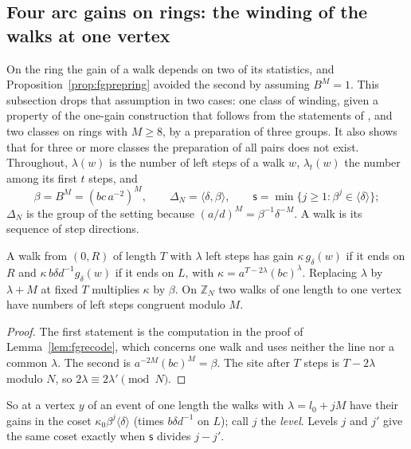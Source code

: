 \subsection{Four arc gains on rings: the winding of the walks at one vertex}

On the ring the gain of a walk depends on two of its statistics, and Proposition~\ref{prop:fgprepring} avoided the second by assuming $B^{M}=1$. This subsection drops that assumption in two cases: one class of winding, given a property of the one-gain construction that follows from the statements of \cite{dgone}, and two classes on rings with $M\ge8$, by a preparation of three groups. It also shows that for three or more classes the preparation of all pairs does not exist. Throughout, $\lambda(w)$ is the number of left steps of a walk $w$, $\lambda_t(w)$ the number among its first $t$ steps, and
\[
\beta=B^{M}=(bc\,a^{-2})^{M},\qquad \Delta_N=\langle\delta,\beta\rangle,\qquad \mathsf{s}=\min\{j\ge1:\beta^{j}\in\langle\delta\rangle\};
\]
$\Delta_N$ is the group of the setting because $(a/d)^{M}=\beta^{-1}\delta^{-M}$. A walk is its sequence of step directions.

\begin{lemma}\label{lem:fgkappa}
A walk from $(0,R)$ of length $T$ with $\lambda$ left steps has gain $\kappa\,g_\delta(w)$ if it ends on $R$ and $\kappa\,b\delta d^{-1}g_\delta(w)$ if it ends on $L$, with $\kappa=a^{T-2\lambda}(bc)^{\lambda}$. Replacing $\lambda$ by $\lambda+M$ at fixed $T$ multiplies $\kappa$ by $\beta$. On $\mathbb{Z}_N$ two walks of one length to one vertex have numbers of left steps congruent modulo $M$.
\end{lemma}
\begin{proof}
The first statement is the computation in the proof of Lemma~\ref{lem:fgrecode}, which concerns one walk and uses neither the line nor a common $\lambda$. The second is $a^{-2M}(bc)^{M}=\beta$. The site after $T$ steps is $T-2\lambda$ modulo $N$, so $2\lambda\equiv2\lambda'\pmod N$.
\end{proof}

So at a vertex $y$ of an event of one length the walks with $\lambda=l_0+jM$ have their gains in the coset $\kappa_0\beta^{j}\langle\delta\rangle$ (times $b\delta d^{-1}$ on $L$); call $j$ the \emph{level}. Levels $j$ and $j'$ give the same coset exactly when $\mathsf{s}$ divides $j-j'$.

